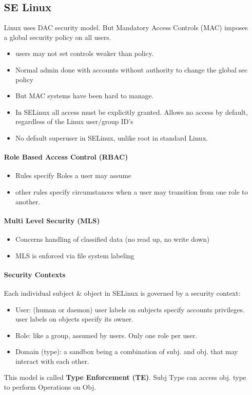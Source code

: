 \subsection{SE Linux}
Linux uses DAC security model. But Mandatory Access Controls (MAC) imposes a global security policy on all users. 
\begin{itemize}
    \item users may not set controls weaker than policy.
    \item Normal admin done with accounts without authority to change the global sec policy
    \item But MAC systems have been hard to manage.
    \item In SELinux all access must be explicitly granted. Allows no access by default, regardless of the Linux user/group ID's
    \item No default superuser in SELinux, unlike root in standard Linux.
\end{itemize}{}

\paragraph{Role Based Access Control (RBAC)}
\begin{itemize}
    \item Rules specify Roles a user may assume
    \item other rules specify circumstances when a user may transition from one role to another.
\end{itemize}{}

\paragraph{Multi Level Security (MLS)}
\begin{itemize}
    \item Concerns handling of classified data (no read up, no write down)
    \item MLS is enforced via file system labeling
\end{itemize}{}

\paragraph{Security Contexts}
Each individual subject & object in SELinux is governed by a security context: 
\begin{itemize}
    \item User: (human or daemon) user labels on subjects specify accounts privileges. user labels on objects specify its owner.
    \item Role: like a group, assumed by users. Only one role per user.
    \item Domain (type): a sandbox being a combination of subj. and obj. that may interact with each other.
\end{itemize}{}
This model is called \textbf{Type Enforcement (TE)}. Subj Type can access obj. type to perform Operations on Obj.\\
\\
